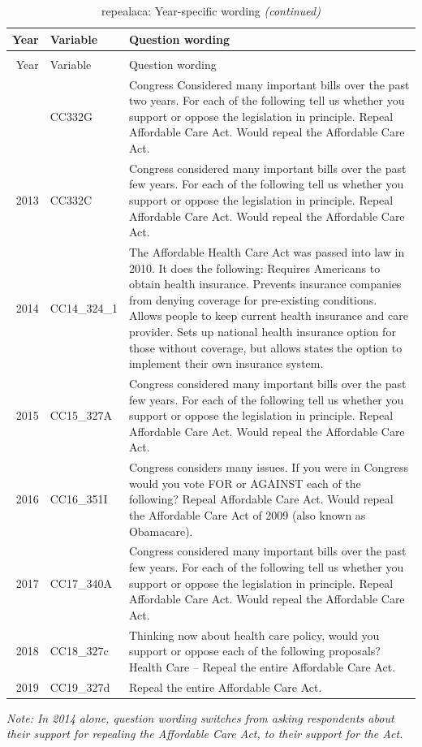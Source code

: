 \documentclass[12pt]{article}
\begin{document}
\begin{longtable}[t]{rl>{\raggedright\arraybackslash}p{10cm}}
\caption{\label{tab:unnamed-chunk-4}repealaca: Year-specific wording}\\
\toprule
Year & Variable & Question wording\\
\midrule
\endfirsthead
\caption[]{repealaca: Year-specific wording \textit{(continued)}}\\
\toprule
Year & Variable & Question wording\\
\midrule
\endhead
\
\endfoot
\bottomrule
\endlastfoot
2012 & CC332G & Congress Considered many important bills over the past two years. For each of the following tell us whether you support or oppose the legislation in principle. Repeal Affordable Care Act. Would repeal the Affordable Care Act.\\
2013 & CC332C & Congress considered many important bills over the past few years. For each of the following tell us whether you support or oppose the legislation in principle. Repeal Affordable Care Act. Would repeal the Affordable Care Act.\\
2014 & CC14\_324\_1 & The Affordable Health Care Act was passed into law in 2010. It does the following: Requires Americans to obtain health insurance. Prevents insurance companies from denying coverage for pre-existing conditions. Allows people to keep current health insurance and care provider. Sets up national health insurance option for those without coverage, but allows states the option to implement their own insurance system.\\
2015 & CC15\_327A & Congress considered many important bills over the past few years. For each of the following tell us whether you support or oppose the legislation in principle. Repeal Affordable Care Act. Would repeal the Affordable Care Act.\\
2016 & CC16\_351I & Congress considers many issues. If you were in Congress would you vote FOR or AGAINST each of the following? Repeal Affordable Care Act. Would repeal the Affordable Care Act of 2009 (also known as Obamacare).\\
2017 & CC17\_340A & Congress considered many important bills over the past few years. For each of the following tell us whether you support or oppose the legislation in principle. Repeal Affordable Care Act. Would repeal the Affordable Care Act.\\
2018 & CC18\_327c & Thinking now about health care policy, would you support or oppose each of the following proposals? Health Care – Repeal the entire Affordable Care Act.\\
2019 & CC19\_327d & Repeal the entire Affordable Care Act.\\*
\end{longtable}

\emph{Note: In 2014 alone, question wording switches from asking
respondents about their support for repealing the Affordable Care Act,
to their support for the Act.}
\end{document}
